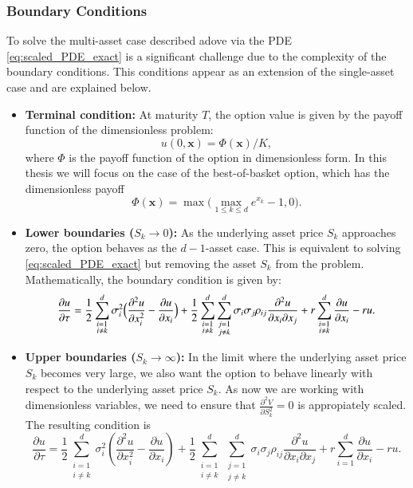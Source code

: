 \documentclass[12pt]{report} %
\theoremstyle{plain}           %
\theoremstyle{definition}      %
\theoremstyle{remark}          %
\begin{document}
\subsubsection{Boundary Conditions}

To solve the multi-asset case described adove via the PDE \eqref{eq:scaled_PDE_exact} is a significant challenge due to the complexity
of the boundary conditions. This conditions appear as an extension of the single-asset case and are explained below.

\begin{itemize}
	\item \textbf{Terminal condition:} At maturity \(T\), the option value is given by the payoff function of the dimensionless problem:
	\[u(0,\mathbf{x}) = \Phi(\mathbf{x})/K,\]	
	where \(\Phi\) is the payoff function of the option in dimensionless form. In this thesis we will focus on the case of the best-of-basket option, which has the dimensionless payoff
	\[\Phi(\mathbf{x}) = \max\bigl(\max_{1\le k\le d}e^{x_k}-1,0\bigr).\]
	\item \textbf{Lower boundaries ($S_k \to 0$):} As the underlying asset price \(S_k\) approaches zero, the option behaves as the $d-1$-asset case. This is equivalent to solving \eqref{eq:scaled_PDE_exact} 
	but removing the asset $S_k$ from the problem. Mathematically, the boundary condition is given by:
	\[
		\frac{\partial u}{\partial \tau} =
			\frac12\sum_{\substack{i=1 \\ i\neq k}}^{d}\sigma_i^{2}
				\Bigl(
					\frac{\partial^{2}u}{\partial x_i^{2}}
				- \frac{\partial u}{\partial x_i}
				\Bigr)
		+ \frac12\sum_{\substack{i=1 \\ i\neq k}}^{d}\sum_{\substack{j=1 \\ j\neq k}}^{d}\sigma_i\sigma_j\rho_{ij}
				\frac{\partial^{2}u}{\partial x_i\partial x_j}
		+ r\sum_{\substack{i=1 \\ i\neq k}}^{d}\frac{\partial u}{\partial x_i}
		- ru.
  	\]
	\item \textbf{Upper boundaries ($S_k \to \infty$):} In the limit where the underlying asset price \(S_k\) becomes very large, we also want the option to behave linearly with respect to the underlying asset price $S_k$.
	As now we are working with dimensionless variables, we need to ensure that $\frac{\partial^2 V}{\partial S_k^2} = 0$ is appropiately scaled. The resulting condition is
	\[
		\frac{\partial u}{\partial \tau} =
		\frac{1}{2}\sum_{\substack{i=1 \\ i\neq k}}^d 
		\sigma_i^{2}\!\left(
		\frac{\partial^{2}u}{\partial x_i^{2}}
		-\frac{\partial u}{\partial x_i}\right)
		+
		\frac{1}{2}\sum_{\substack{i=1 \\ i\neq k}}^d
			\sum_{\substack{j=1 \\ j\neq k}}^d
		\sigma_i\sigma_j\rho_{ij}
		\frac{\partial^{2}u}{\partial x_i\partial x_j}
		+
		r\sum_{i=1}^d\frac{\partial u}{\partial x_i}
		-
		ru.
	\]
\end{itemize}
\end{document}
